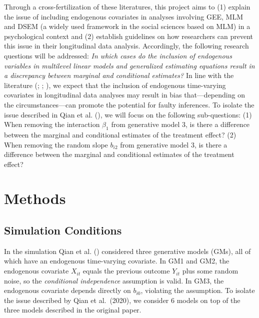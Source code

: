 \documentclass[
  12pt,
  a4paper,
]{article}
\begin{document}
Through a cross-fertilization of these literatures, this project aims to
(1) explain the issue of including endogenous covariates in analyses
involving GEE, MLM and DSEM (a widely used framework in the social
sciences based on MLM) in a psychological context and (2) establish
guidelines on how researchers can prevent this issue in their
longitudinal data analysis. Accordingly, the following research
questions will be addressed: \emph{In which cases do the inclusion of
endogenous variables in multilevel linear models and generalized
estimating equations result in a discrepancy between marginal and
conditional estimates?} In line with the literature
(; ; ), we
expect that the inclusion of endogenous time-varying covariates in
longitudinal data analyses may result in bias that---depending on the
circumstances---can promote the potential for faulty inferences. To
isolate the issue described in Qian et al.
(), we will focus on the following
sub-questions: (1) When removing the interaction \(\beta_1\) from
generative model 3, is there a difference between the marginal and
conditional estimates of the treatment effect? (2) When removing the
random slope \(b_{i2}\) from generative model 3, is there a difference
between the marginal and conditional estimates of the treatment effect?

\newpage

\section{Methods}\label{methods}

\newpage

\subsection{Simulation Conditions}\label{simulation-conditions}

In the simulation Qian et al. () considered
three generative models (GMs), all of which have an endogenous
time-varying covariate. In GM1 and GM2, the endogenous covariate
\(X_{it}\) equals the previous outcome \(Y_{it}\) plus some random
noise, so the \emph{conditional independence} assumption is valid. In
GM3, the endogenous covariate depends directly on \(b_{i0}\), violating
the assumption. To isolate the issue described by Qian et al.~(2020), we
consider 6 models on top of the three models described in the original
paper.
\end{document}
